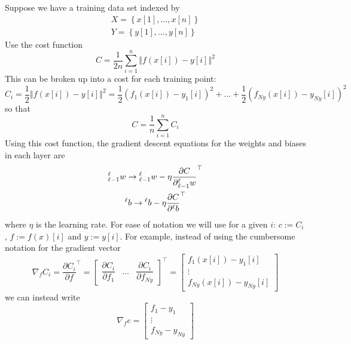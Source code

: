 \documentclass[11pt]{report} %
\begin{document}
Suppose we have a training data set indexed by
\begin{gather}
X=\left\{ x\left[1\right],\dots,x\left[n\right]\right\} \\
Y=\left\{ y\left[1\right],\dots,y\left[n\right]\right\} 
\end{gather}
Use the cost function
\begin{equation}
C=\dfrac{1}{2n}\sum_{i=1}^{n}\left\Vert f\left(x\left[i\right]\right)-y\left[i\right]\right\Vert ^{2}
\end{equation}
This can be broken up into a cost for each training point:
\begin{equation}
C_{i}=\dfrac{1}{2}\left\Vert f\left(x\left[i\right]\right)-y\left[i\right]\right\Vert ^{2}=\dfrac{1}{2}\left(f_{1}\left(x\left[i\right]\right)-y_{1}\left[i\right]\right)^{2}+\dots+\dfrac{1}{2}\left(f_{Ny}\left(x\left[i\right]\right)-y_{Ny}\left[i\right]\right)^{2}
\end{equation}
so that
\begin{equation}
C=\dfrac{1}{n}\sum_{i=1}^{n}C_{i}
\end{equation}
Using this cost function, the gradient descent equations for the weights and biases in each layer are
\begin{gather}
\mathstrut_{\ell-1}^{\ell}w\rightarrow\mathstrut_{\ell-1}^{\ell}w-\eta\dfrac{\partial C}{\partial\mathstrut_{\ell-1}^{\ell}w}^{\top} \\
\mathstrut^{\ell}b\rightarrow\mathstrut^{\ell}b-\eta\dfrac{\partial C}{\partial\mathstrut^{\ell}b}^{\top}
\end{gather}
where $\eta$ is the learning rate. For ease of notation we will use for a given $i$: $c := C_{i}$, $f := f\left(x\right)\left[i\right]$ and $y:= y\left[i\right]$. For example, instead of using the cumbersome notation for the gradient vector
\begin{equation}
\nabla_{f}C_{i}=\dfrac{\partial C_{i}}{\partial f}^{\top}=\begin{bmatrix}\dfrac{\partial C_{i}}{\partial f_{1}} & \dots & \dfrac{\partial C_{i}}{\partial f_{Ny}}\end{bmatrix}^{\top}=\begin{bmatrix}f_{1}\left(x\left[i\right]\right)-y_{1}\left[i\right]\\
\vdots\\
f_{Ny}\left(x\left[i\right]\right)-y_{Ny}\left[i\right]
\end{bmatrix}
\end{equation}
we can instead write
\begin{equation}
\nabla_{f}c=\begin{bmatrix}f_{1}-y_{1}\\
\vdots\\
f_{Ny}-y_{Ny}
\end{bmatrix}
\end{equation}
\end{document}
